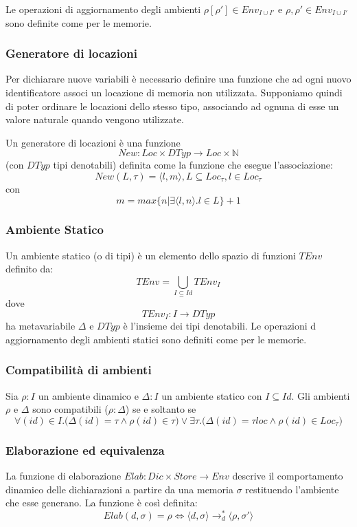 \documentclass[a4paper, 10pt]{article}
\begin{document}
	Le operazioni di aggiornamento degli ambienti $\rho[\rho'] \in Env_{I \cup I'}$ e $\rho,\rho' \in Env_{I \cup I'}$ sono definite come per le memorie.
	
	\subsubsection{Generatore di locazioni}
	Per dichiarare nuove variabili è necessario definire una funzione che ad ogni nuovo identificatore associ un locazione di memoria non utilizzata. Supponiamo quindi di poter ordinare le locazioni dello stesso tipo, associando ad ognuna di esse un valore naturale quando vengono utilizzate.
	
	Un generatore di locazioni è una funzione 
	\[
	New:Loc \times DTyp \to Loc \times \mathbb{N}
	\]  
	(con $DTyp$ tipi denotabili) definita come la funzione che esegue l'associazione:
	\[
	New(L, \tau) = \langle l,m \rangle, L \subseteq Loc_\tau, l\in Loc_\tau
	\] con 
	\[
	m=max\{n | \exists \langle l,n \rangle.l\in L\}+1
	\]
	
	\subsubsection{Ambiente Statico}
	Un ambiente statico (o di tipi) è un elemento dello spazio di funzioni $TEnv$ definito da: 
	\[
	TEnv= \bigcup\limits_{I \subseteq Id} TEnv_I
	\]
	dove 
	\[
	TEnv_I:I \to DTyp
	\] 
	ha metavariabile $\Delta$ e $DTyp$ è l'insieme dei tipi denotabili. Le operazioni d aggiornamento degli ambienti statici sono definiti come per le memorie.
	
	\subsubsection{Compatibilità di ambienti}
	Sia $\rho : I$ un ambiente dinamico e $\Delta:I$ un ambiente statico con $I\subseteq Id$. Gli ambienti $\rho$ e $\Delta$ sono compatibili ($\rho : \Delta$) se e soltanto se 
	\[
	\forall(id) \in I.\big(\Delta(id)=\tau \wedge \rho(id) \in \tau\big) \vee \exists \tau.\big(\Delta(id) = \tau loc \wedge \rho(id) \in Loc_\tau\big)
	\]
	
	\subsubsection{Elaborazione ed equivalenza}
	La funzione di elaborazione $Elab:Dic \times Store \to Env$ descrive il comportamento dinamico delle dichiarazioni a partire da una memoria $\sigma$ restituendo l'ambiente che esse generano. La funzione è così definita:
	\[
	Elab(d, \sigma)=\rho \iff \langle d,\sigma \rangle \to_d^* \langle \rho, \sigma' \rangle
	\]
	
\end{document}

